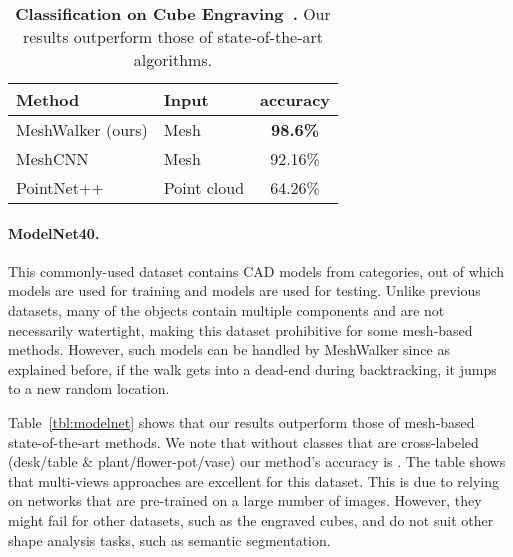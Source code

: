 \documentclass[acmtog]{acmart}
\begin{document}
\begin{table}[htb]\caption{{\bf Classification on Cube Engraving~\cite{hanocka2019meshcnn}.} 
Our results outperform those of state-of-the-art algorithms.}
\begin{center}
\begin{tabular}{||l l c||} 
\hline
 Method & Input & accuracy\\ [0.5ex] 
 \hline\hline\hline
 MeshWalker (ours) & Mesh & \textbf{98.6\%} \\ 
 \hline
 MeshCNN~\cite{hanocka2019meshcnn} & Mesh & 92.16\% \\
 \hline\hline
 PointNet++~\cite{qi2017pointnet++} & Point cloud & 64.26\% \\
 \hline
\end{tabular}
\label{tbl:cubes}
\end{center}
\end{table}


\paragraph{ModelNet40.}
This commonly-used dataset contains  CAD models from  categories, out of which  models are used for training and  models are used for testing.
Unlike previous datasets, many of the objects contain multiple components and are not necessarily watertight, making this dataset prohibitive for some mesh-based methods.
However, such models can be handled by MeshWalker since as explained before, if the walk gets into a dead-end during backtracking, it jumps to a new random location.

Table~\ref{tbl:modelnet} shows that our results  outperform those of mesh-based state-of-the-art methods.
We note that without  classes that are cross-labeled (desk/table \& plant/flower-pot/vase) our method's accuracy is .
The table shows that multi-views approaches are excellent for this dataset. 
This is due to relying on networks that are pre-trained on a large number of images.
However, they might fail for other datasets, such as the engraved cubes, and do not suit other shape analysis tasks, such as semantic segmentation.
\end{document}
